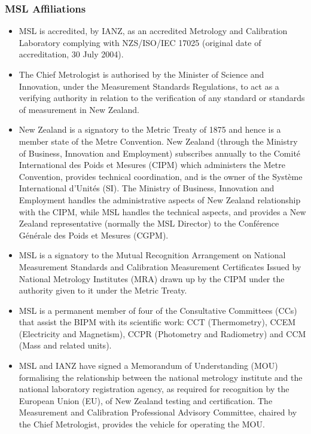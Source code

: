 \subsubsection{MSL Affiliations}
\label{sss:affiliations}
\begin{itemize}

\item	MSL is accredited, by IANZ, as an accredited Metrology and Calibration Laboratory complying with NZS/ISO/IEC 17025 (original date of accreditation, 30 July 2004). 

\item	The Chief Metrologist is authorised by the Minister of Science and Innovation, under the Measurement Standards Regulations, 
to act as a verifying authority in relation to the verification of any standard or standards of measurement in New Zealand.

\item	New Zealand is a signatory to the Metric Treaty of 1875 and hence is a member state of the Metre Convention.  New Zealand (through the Ministry of Business, Innovation and Employment) subscribes annually to the Comit\'e International des Poids et Mesures (CIPM) which administers the Metre Convention, provides technical coordination, and is the owner of the Syst\`eme International d'Unit\'es (SI). The Ministry of Business, Innovation and Employment handles the administrative aspects of New Zealand relationship with the CIPM, 
while MSL handles the technical aspects, and provides a New Zealand representative (normally the MSL Director) to the Conf\'erence G\'en\'erale des Poids et Mesures (CGPM).

\item	MSL is a signatory to the Mutual Recognition Arrangement on National Measurement Standards and Calibration Measurement Certificates Issued by National Metrology Institutes (MRA) drawn up by the CIPM under the authority given to it under the Metric Treaty.

\item	MSL is a permanent member of four of the Consultative Committees (CCs) that assist the BIPM with its scientific work: CCT (Thermometry), CCEM (Electricity and Magnetism), CCPR (Photometry and Radiometry) and CCM (Mass and related units). 

\item	MSL and IANZ have signed a Memorandum of Understanding (MOU) formalising the relationship between the national metrology institute and the national laboratory registration agency, as required for recognition by the European Union (EU), of New Zealand testing and certification. The Measurement and Calibration Professional Advisory Committee, chaired by the Chief Metrologist, provides the vehicle for operating the MOU.


\end{itemize}
